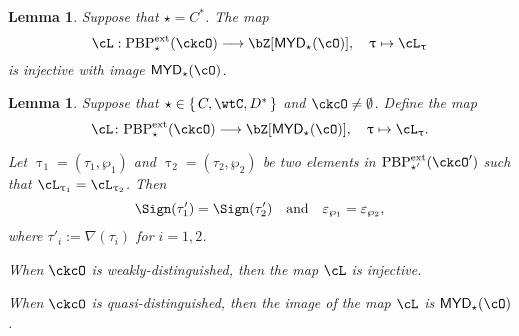 \documentclass[12pt,a4paper]{amsart}
\newcommand{\AC}{\mathrm{AC}}
\def\MYD{{\mathsf{MYD}}}
\def\DD{\nabla}
\numberwithin{equation}{section}
\newtheorem{lem}[thm]{Lemma}
\theoremstyle{remark}
\def\PBPes{\mathrm{PBP}^{\mathrm{ext}}_{\star}}
\def\PBPesp{\mathrm{PBP}^{\mathrm{ext}}_{\star'}}
\def\ckcOp{\ckcO^{\prime}}
\def\cOp{\cO^{\prime}}
\begin{document}
\begin{lem}\label{lem:C*}
Suppose that $\star = C^{*}$. The map
    \[
 \acm: \PBPes( \ckcO )\longrightarrow \bZ[\MYD_{\star}(\cO)],
      \quad \uptau\mapsto \ac_{\uptau}
    \]
    is injective with image $\MYD_{\star}(\cO)$.
\end{lem}
\begin{lem}\label{lem:C}
  Suppose that $\star \in \set{C,\wtC,D^{*}}$ and $\ckcO\neq \emptyset$. Define the map
  \[
      \acm \colon
      \PBPes( \ckcO )\longrightarrow \bZ[\MYD_{\star}(\cO)],
      \quad \uptau\mapsto \ac_{\uptau}.
    \]
  \begin{enuma}
    \item Let $\uptau_{1} = (\tau_{1},\wp_{1})$ and
    $\uptau_{2}=(\tau_{2},\wp_{2})$ be two elements in $\PBPesp(\ckcOp)$ such
    that $\ac_{\uptau_{1}} =  \ac_{\uptau_{2}}$. Then
    \[
      \Sign(\tau'_{1})=\Sign(\tau'_{2}) \quad \text{and} \quad
    \varepsilon_{\wp_{1}}=\varepsilon_{\wp_{2}}, \]
    where $\tau'_{i} :=
    \DD(\tau_{i})$ for $i=1,2$.
    \item When $\ckcO$ is weakly-distinguished, then the map $\acm$ is injective.    
    \item When $\ckcO$ is quasi-distinguished, then the image of the map $\acm$ is $\MYD_{\star}(\cO)$.
  \end{enuma}
\end{lem}
\end{document}
